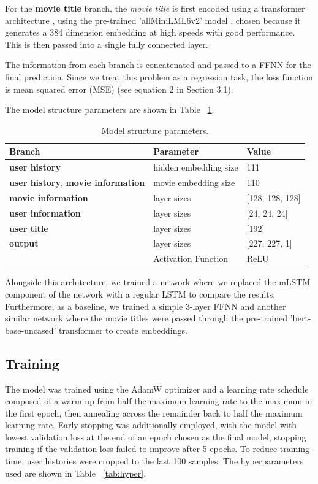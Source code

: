 \documentclass{bioinfo}
\begin{document}
\begin{methods}
For the \textbf{movie title} branch, the \textit{movie title} is first encoded using a transformer architecture \citep{vaswani2017attention}, using the pre-trained 'all\-MiniLM\-L6\-v2' model \citep{reimers-2019-sentence-bert}, chosen because it generates a 384 dimension embedding at high speeds with good performance. This is then passed into a single fully connected layer.

The information from each branch is concatenated and passed to a FFNN for the final prediction. Since we treat this problem as a regression task, the loss function is mean squared error (MSE) (see equation 2 in Section 3.1).

The model structure parameters are shown in Table ~\ref{tab:model}.

\begin{table}[H]
\centering
\begin{tabular}{|l|l|l|}
\hline
\textbf{Branch} & \textbf{Parameter} & \textbf{Value} \\ \hline

\textbf{user history} & hidden embedding size & 111 \\ \hline
\textbf{user history}, \textbf{movie information} & movie embedding size & 110 \\ \hline
\textbf{movie information} & layer sizes & [128, 128, 128]\\ \hline
\textbf{user information} & layer sizes & [24, 24, 24]\\ \hline
\textbf{user title} & layer sizes & [192]\\ \hline
\textbf{output} & layer sizes & [227, 227, 1]\\ \hline
 & Activation Function & ReLU \\ \hline
\end{tabular}
\caption{Model structure parameters.}
\label{tab:model}
\end{table}

Alongside this architecture, we trained a network where we replaced the mLSTM component of the network with a regular LSTM to compare the results. Furthermore, as a baseline, we trained a simple 3-layer FFNN and another similar network where the movie titles were passed through the pre-trained 'bert-base-uncased' transformer to create embeddings.

\subsection{Training}
The model was trained using the AdamW optimizer \citep{loshchilov2017decoupled} and a learning rate schedule composed of a warm-up from half the maximum learning rate to the maximum in the first epoch, then annealing across the remainder back to half the maximum learning rate. Early stopping was additionally employed, with the model with lowest validation loss at the end of an epoch chosen as the final model, stopping training if the validation loss failed to improve after 5 epochs. To reduce training time, user histories were cropped to the last 100 samples. The hyperparameters used are shown in Table ~\ref{tab:hyper}.


\end{methods}
\end{document}
